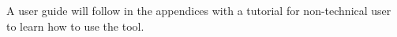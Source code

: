 \documentclass[10pt, a4paper]{report}
\theoremstyle{definition}
\begin{document}
	
	
	
	\begin{abstract}
		
	\end{abstract}
	
	\setcounter{tocdepth}{1}
	\tableofcontents 
	
	\vspace*{\baselineskip}
	A user guide will follow in the appendices with a tutorial for non-technical user to learn how to use the tool.
	 
	\cleardoublepage

	
	
	
	
	
	


	\cleardoublepage
	
	
\end{document}
